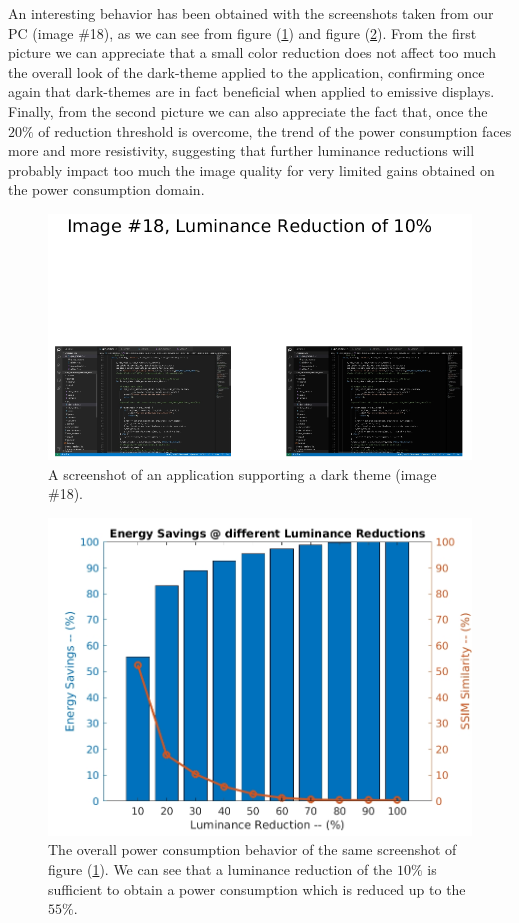 \documentclass[a4paper]{article}
\begin{document}
            An interesting behavior has been obtained with the screenshots taken from our PC (image \#18), as we can see from figure (\ref{fig:luminance_reduction_10perc_img_18}) and figure (\ref{fig:ImagePercSavingsBar_LUMRED_SSIM_img_18}).
            From the first picture we can appreciate that a small color reduction does not affect too much the overall look of the dark-theme applied to the application, confirming once again that dark-themes are in fact beneficial when applied to emissive displays.
            Finally, from the second picture we can also appreciate the fact that, once the $20\%$ of reduction threshold is overcome, the trend of the power consumption faces more and more resistivity, suggesting that further luminance reductions will probably impact too much the image quality for very limited gains obtained on the power consumption domain.

            \begin{figure}[htp]
                \centering
                \includegraphics[width=0.6 \columnwidth]{./screenshots/luminance_reduction_10perc_img_18}
                \caption{
                        \label{fig:luminance_reduction_10perc_img_18}
                        A screenshot of an application supporting a dark theme (image \#18).
                }
            \end{figure}

            \begin{figure}[htp]
                \centering
                \includegraphics[width=0.6 \columnwidth]{./screenshots/ImagePercSavingsBar_LUMRED_SSIM_img_18}
                \caption{
                        \label{fig:ImagePercSavingsBar_LUMRED_SSIM_img_18}
                        The overall power consumption behavior of the same screenshot of figure (\ref{fig:luminance_reduction_10perc_img_18}). We can see that a luminance reduction of the $10\%$ is sufficient to obtain a power consumption which is reduced up to the $55\%$.
                }
            \end{figure}
\end{document}
